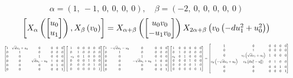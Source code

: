 \documentclass[11pt]{article}
\theoremstyle{definition}
\begin{document}
\[
\alpha = \left( 1, \  -1, \  0, \  0, \  0, \  0\right), \quad \beta = \left( -2, \  0, \  0, \  0, \  0, \  0\right)
\]
\[
\scaletoalign{\textwidth}{\left[ X_{\alpha}\left(\left[\begin{matrix}u_{0}\\u_{1}\end{matrix}\right]\right), X_{\beta}\left(v_{0}\right) \right] = X_{\alpha + \beta}\left(\left[\begin{matrix}u_{0} v_{0}\\- u_{1} v_{0}\end{matrix}\right]\right) X_{2\alpha + \beta}\left(v_{0} \left(- d u_{1}^{2} + u_{0}^{2}\right)\right)}
\]
\[
\scaletoalign{\textwidth}{{\left[\begin{matrix}1 & \sqrt{d} u_{1} + u_{0} & 0 & 0 & 0 & 0\\0 & 1 & 0 & 0 & 0 & 0\\0 & 0 & 1 & 0 & 0 & 0\\0 & 0 & \sqrt{d} u_{1} - u_{0} & 1 & 0 & 0\\0 & 0 & 0 & 0 & 1 & 0\\0 & 0 & 0 & 0 & 0 & 1\end{matrix}\right]} {\left[\begin{matrix}1 & 0 & 0 & 0 & 0 & 0\\0 & 1 & 0 & 0 & 0 & 0\\- v_{0} & 0 & 1 & 0 & 0 & 0\\0 & 0 & 0 & 1 & 0 & 0\\0 & 0 & 0 & 0 & 1 & 0\\0 & 0 & 0 & 0 & 0 & 1\end{matrix}\right]} {\left[\begin{matrix}1 & - \sqrt{d} u_{1} - u_{0} & 0 & 0 & 0 & 0\\0 & 1 & 0 & 0 & 0 & 0\\0 & 0 & 1 & 0 & 0 & 0\\0 & 0 & - \sqrt{d} u_{1} + u_{0} & 1 & 0 & 0\\0 & 0 & 0 & 0 & 1 & 0\\0 & 0 & 0 & 0 & 0 & 1\end{matrix}\right]} {\left[\begin{matrix}1 & 0 & 0 & 0 & 0 & 0\\0 & 1 & 0 & 0 & 0 & 0\\v_{0} & 0 & 1 & 0 & 0 & 0\\0 & 0 & 0 & 1 & 0 & 0\\0 & 0 & 0 & 0 & 1 & 0\\0 & 0 & 0 & 0 & 0 & 1\end{matrix}\right]} = {\left[\begin{matrix}1 & 0 & 0 & 0 & 0 & 0\\0 & 1 & 0 & 0 & 0 & 0\\0 & v_{0} \left(\sqrt{d} u_{1} + u_{0}\right) & 1 & 0 & 0 & 0\\v_{0} \left(- \sqrt{d} u_{1} + u_{0}\right) & v_{0} \left(d u_{1}^{2} - u_{0}^{2}\right) & 0 & 1 & 0 & 0\\0 & 0 & 0 & 0 & 1 & 0\\0 & 0 & 0 & 0 & 0 & 1\end{matrix}\right]}}
\]
\end{document}
